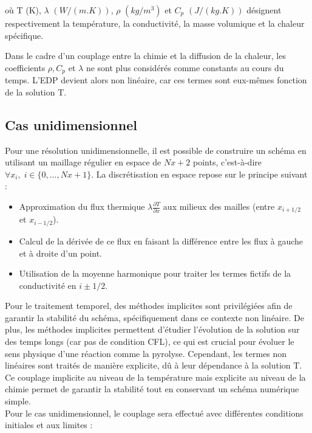\documentclass[a4paper,11pt]{article}
\begin{document}
où T (K), $\lambda$ $(W/(m.K))$, $\rho$ $(kg/m^3)$ et $C_p$ $(J/(kg.K))$ désignent respectivement la température, la conductivité, la masse volumique et la chaleur spécifique.

Dans le cadre d'un couplage entre la chimie et la diffusion de la chaleur, les coefficients $\rho, C_p$ et $\lambda$ ne sont plus considérés comme constants au cours du temps. L'EDP devient alors non linéaire, car ces termes sont eux-mêmes fonction de la solution T. \\

\subsection{Cas unidimensionnel} Pour une résolution unidimensionnelle, il est possible de construire un schéma en utilisant un maillage régulier en espace de $Nx + 2$ points, c'est-à-dire $\forall x_i,\; i \in \{0, \dots, Nx+1\}$. La discrétisation en espace repose sur le principe suivant :
\begin{itemize}
    \item Approximation du flux thermique \( \lambda \frac{\partial T}{\partial x} \) aux milieux des mailles (entre $x_{i+1/2}$ et $x_{i-1/2}$).
    \item Calcul de la dérivée de ce flux en faisant la différence entre les flux à gauche et à droite d’un point.
    \item Utilisation de la moyenne harmonique pour traiter les termes fictifs de la conductivité en $i\pm1/2$.
  \end{itemize}

\vspace{0.5cm}
Pour le traitement temporel, des méthodes implicites sont privilégiées afin de garantir la stabilité du schéma, spécifiquement dans ce contexte non linéaire. De plus, les méthodes implicites permettent d'étudier l'évolution de la solution sur des temps longs (car pas de condition CFL), ce qui est crucial pour évoluer le sens physique d'une réaction comme la pyrolyse. Cependant, les termes non linéaires sont traités de manière explicite, dû à leur dépendance à la solution T. Ce couplage implicite au niveau de la température mais explicite au niveau de la chimie permet de garantir la stabilité tout en conservant un schéma numérique simple.\\


Pour le cas unidimensionnel, le couplage sera effectué avec différentes conditions initiales et aux limites :
\end{document}
